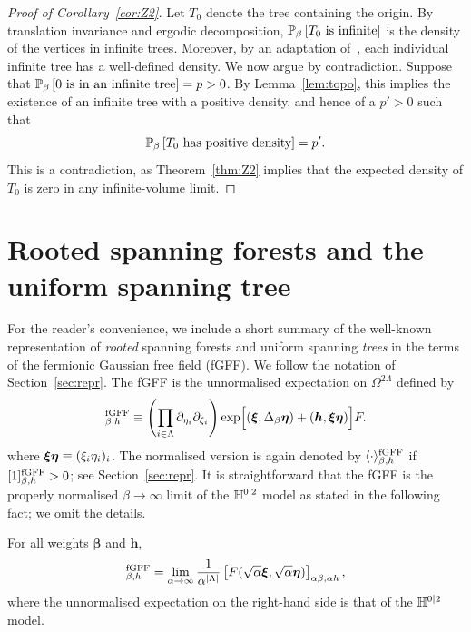 \documentclass[11pt]{amsart}
\numberwithin{equation}{section}
\numberwithin{theorem}{section}
\newcommand{\ob}[1]{\left(#1\right )} %
\newcommand{\cb}[1]{\left[#1\right ]} %
\newcommand{\V}[1]{\boldsymbol{#1}}
\begin{document}
\begin{proof}[Proof of Corollary~\ref{cor:Z2}] 
  Let $T_{0}$ denote the tree containing the origin. By translation
  invariance and ergodic decomposition,
  $\P_{\beta}\cb{\text{$T_{0}$ is infinite}}$ is the density of
  the vertices in infinite trees. Moreover, by an adaptation
  of~\cite[Theorem~1]{MR990777}, each individual infinite tree has a
  well-defined density. We now argue by contradiction. Suppose that
  $\P_{\beta}\cb{\text{$0$ is in an infinite tree}}=p>0$. By
  Lemma~\ref{lem:topo}, this implies the existence of an infinite tree
  with a positive density, and hence of a $p'>0$ such that
  \begin{equation}
    \P_{\beta}\cb{\text{$T_{0}$ has positive density}}=p'.
  \end{equation}
  This is a contradiction, as Theorem~\ref{thm:Z2} implies that the
  expected density of $T_{0}$ is zero in any infinite-volume limit.
\end{proof}


\section{Rooted spanning forests and the uniform spanning tree}
\label{app:UST}

For the reader's convenience, we include a short summary of the
well-known representation of \emph{rooted} spanning forests and
uniform spanning \emph{trees} in the terms of the fermionic Gaussian
free field (fGFF).  We follow the notation of Section~\ref{sec:repr}.
The fGFF is the unnormalised expectation on
$\Omega^{2\Lambda}$ defined by
\begin{equation}
  [F]_{\beta,h}^{\rm fGFF} \bydef \ob{\prod_{i\in\Lambda} \partial_{\eta_i}\partial_{\xi_i}}
  \exp\qB{(\V{\xi},\Delta_\beta \V{\eta}) + (\V{h},\V{\xi\eta})} F.
\end{equation}
where $\V{\xi\eta} \bydef (\xi_i\eta_i)_i$.
The normalised version is again denoted by $\langle \cdot \rangle^{\rm fGFF}_{\beta,h}$ if
$[1]^{\rm fGFF}_{\beta,h}>0$; see Section~\ref{sec:repr}.
It is straightforward that
the fGFF is the properly normalised $\beta\to\infty$ limit of the $\mathbb{H}^{0|2}$ model
as stated in the following fact;
we omit the details. 
\begin{fact}
  For all weights $\V{\beta}$ and $\V{h}$,
  \begin{equation}
    [F(\V{\xi}, \V{\eta})]_{\beta,h}^{\rm fGFF}
    =
    \lim_{\alpha \to \infty}
    \frac{1}{\alpha^{|\Lambda|}}\qa{F(\sqrt{\alpha}\V{\xi},\sqrt{\alpha}\V{\eta})}_{\alpha \beta,\alpha h}
    ,
  \end{equation}
  where the unnormalised expectation on the right-hand side is that of the $\mathbb{H}^{0|2}$ model.
\end{fact}
\end{document}
